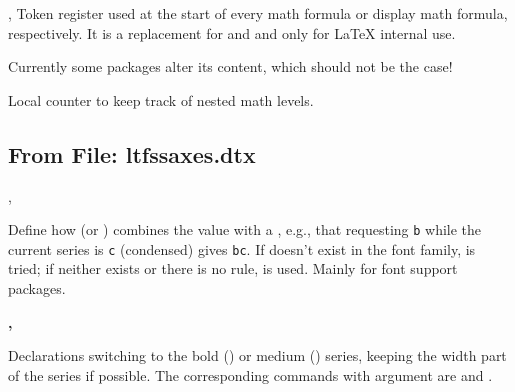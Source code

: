 \documentclass{l3in2edoc}
\begin{document}
\begin{function}[int]
  {
    \frozen@everymath,
    \frozen@everydisplay
  }
%
  Token register used at the start of every math formula or display
  math formula, respectively. It is a replacement for 
  and  and only for \LaTeX{} internal use.

  Currently some packages alter its content, which should not be the case!
\end{function}




\begin{function}[int]
  {
    \@math@level
  }
  Local counter to keep track of nested math levels.
\end{function}





\subsection{From File: ltfssaxes.dtx}


\begin{function}[user]
  {
    \DeclareFontSeriesChangeRule,
    \DeclareFontShapeChangeRule
  }
  \begin{syntax}
        
  \end{syntax}
  Define how  (or ) combines the
   value with a , e.g., that requesting
  \texttt{b} while the current series is \texttt{c} (condensed) gives
  \texttt{bc}. If  doesn't exist in the font family,
   is tried; if neither exists or there is no rule,
   is used. Mainly for font support packages.
\end{function}




\begin{function}[]
  {
    \bfseries,
    \mdseries
  }
  \begin{syntax}
  \end{syntax}
  Declarations switching to the bold () or medium
  () series, keeping the width part of the series if
  possible. The corresponding commands with argument are 
  and .
\end{function}
\end{document}
